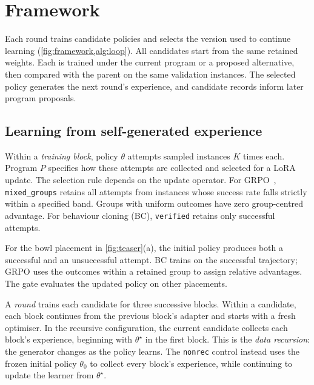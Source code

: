 \section{Framework}
\label{sec:method}
Each round trains candidate policies and selects the version used to continue learning (\cref{fig:framework,alg:loop}). All candidates start from the same retained weights. Each is trained under the current program or a proposed alternative, then compared with the parent on the same validation instances. The selected policy generates the next round's experience, and candidate records inform later program proposals.

\subsection{Learning from self-generated experience}
\label{sec:experience}
Within a \emph{training block}, policy $\theta$ attempts sampled instances $K$ times each. Program $P$ specifies how these attempts are collected and selected for a LoRA update. The selection rule depends on the update operator. For GRPO~\cite{shao2024deepseekmath}, \texttt{mixed\_groups} retains all attempts from instances whose success rate falls strictly within a specified band. Groups with uniform outcomes have zero group-centred advantage. For behaviour cloning (BC), \texttt{verified} retains only successful attempts.

For the bowl placement in \cref{fig:teaser}(a), the initial policy produces both a successful and an unsuccessful attempt. BC trains on the successful trajectory; GRPO uses the outcomes within a retained group to assign relative advantages. The gate evaluates the updated policy on other placements.

A \emph{round} trains each candidate for three successive blocks. Within a candidate, each block continues from the previous block's adapter and starts with a fresh optimiser. In the recursive configuration, the current candidate collects each block's experience, beginning with $\theta^\star$ in the first block. This is the \emph{data recursion}: the generator changes as the policy learns. The \texttt{nonrec} control instead uses the frozen initial policy $\theta_0$ to collect every block's experience, while continuing to update the learner from $\theta^\star$.

